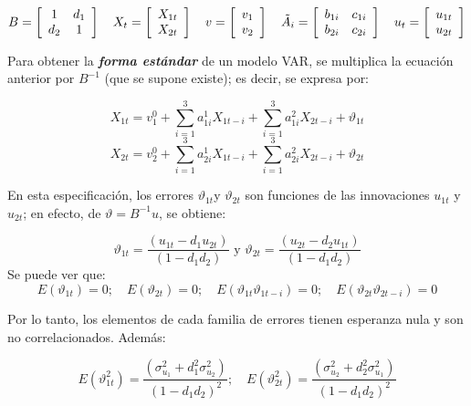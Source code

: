 \[
B=\left[ {\begin{array}{*{20}c}
1 & d_{1}\\
d_{2} & 1\\
\end{array} } \right]\quad
X_{t}=\left[ 
{\begin{array}{*{20}c}
X_{1t}\\
X_{2t}\\
\end{array} } \right]\quad
v=\left[ {\begin{array}{*{20}c}
v_{1}\\
v_{2}\\
\end{array} } \right]\quad
\tilde{A}_{i}=\left[ 
{\begin{array}{*{20}c}
b_{1i} & c_{1i}\\
b_{2i} & c_{2i}\\
\end{array} } \right]\quad
u_{t}=\left[ {\begin{array}{*{20}c}
u_{1t}\\
u_{2t}\\
\end{array} } \right]
\]

Para obtener la \textbf{\textit{forma est\'{a}ndar}} de un modelo VAR, se multiplica la ecuaci\'{o}n anterior por $B^{-1}$ (que se supone existe); es decir, se expresa por:

\[
X_{1t}=v_{1}^{0}+\sum_{i=1}^3 {a_{1i}^{1}X_{1t-i}} +\sum_{i=1}^3 {a_{1i}^{2}X_{2t-i}} +\vartheta_{1t}
\]
\[
X_{2t}=v_{2}^{0}+\sum_{i=1}^3 {a_{2i}^{1}X_{1t-i}} +\sum_{i=1}^3 {a_{2i}^{2}X_{2t-i}} +\vartheta_{2t}
\]

En esta especificaci\'{o}n, los errores $\vartheta_{1t}$y $\vartheta_{2t}$ son funciones de las innovaciones $u_{1t}$ y $u_{2t}$; en efecto, de $\vartheta =B^{-1}u$, se obtiene:

\[
\vartheta_{1t}=\frac{\left( u_{1t}-d_{1}u_{2t} \right)}{\left( 1-d_{1}d_{2} \right)}\text{ y }\vartheta_{2t}=
\frac{\left( u_{2t}-d_{2}u_{1t} \right)}{\left( 1-d_{1}d_{2} \right)}
\]
Se puede ver que:
\[
E\left( \vartheta_{1t} \right)=0;\quad E\left( \vartheta_{2t} \right)=0;\quad E\left( \vartheta_{1t}\vartheta_{1t-i} 
\right)=0;\quad E\left( \vartheta_{2t}\vartheta_{2t-i} \right)=0
\]

Por lo tanto, los elementos de cada familia de errores tienen esperanza nula y son no correlacionados. Adem\'{a}s:

\[
E\left( \vartheta_{1t}^{2} \right)=\frac{\left( \sigma_{u_{1}}^{2}+d_{1}^{2}\sigma_{u_{2}}^{2} \right)}{\left( 1-d_{1}d_{2} 
\right)^{2}};\quad E\left( \vartheta_{2t}^{2} \right)=\frac{\left( \sigma_{u_{2}}^{2}+d_{2}^{2}\sigma_{u_{1}}^{2} \right)}{\left( 1-d_{1}d_{2} \right)^{2}}
\]

